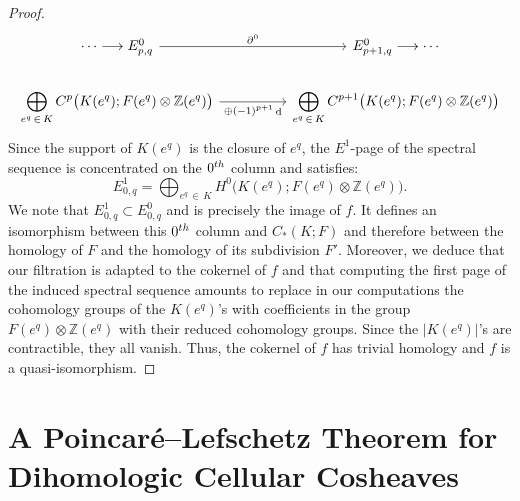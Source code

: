 \documentclass[10pt]{amsart}
\theoremstyle{definition}
\numberwithin{equation}{section}
\numberwithin{figure}{section}
\newcommand{\Z}{\mathbb{Z}}
\DeclareMathOperator{\df}{d}
\begin{document}
\begin{proof}
\begin{equation*}
\begin{tikzcd}
\cdots \longrightarrow E^0_{p,q} \ar[rr,"\partial^0"] & & E^0_{p+1,q} \longrightarrow \cdots \\%
\displaystyle \bigoplus_{e^q\,\in\,K} C^p\big(K(e^q);F(e^q)\otimes\Z(e^q)\big) \ar[rr,"\oplus(-1)^{p+1}\df" below] & & \displaystyle \bigoplus_{e^q\,\in\,K} C^{p+1}\big(K(e^q);F(e^q)\otimes\Z(e^q)\big)
\end{tikzcd}
\end{equation*}
Since the support of $K(e^q)$ is the closure of $e^q$, the $E^1$-page of the spectral sequence is concentrated on the $0^{\rm th}$ column and satisfies:
\begin{equation*}
E^1_{0,q}=\bigoplus_{e^q\,\in\,K} H^0\big(K(e^q);F(e^q)\otimes\Z(e^q)\big).
\end{equation*}
We note that $E^1_{0,q}\subset E^0_{0,q}$ and is precisely the image of $f$. It defines an isomorphism between this $0^{\rm th}$ column and $C_*(K;F)$ and therefore between the homology of $F$ and the homology of its subdivision $F'$. Moreover, we deduce that our filtration is adapted to the cokernel of $f$ and that computing the first page of the induced spectral sequence amounts to replace in our computations the cohomology groups of the $K(e^q)$'s with coefficients in the group $F(e^q)\otimes\Z(e^q)$ with their reduced cohomology groups. Since the $|K(e^q)|$'s are contractible, they all vanish. Thus, the cokernel of $f$ has trivial homology and $f$ is a quasi-isomorphism.
\end{proof}

\section{A Poincaré--Lefschetz Theorem for Dihomologic Cellular Cosheaves}
\end{document}
